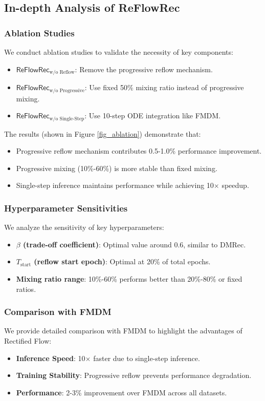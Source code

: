 \documentclass[sigconf]{acmart}
\begin{document}
\subsection{In-depth Analysis of ReFlowRec}
\subsubsection{\textbf{Ablation Studies}}
We conduct ablation studies to validate the necessity of key components:
\begin{itemize}[leftmargin=*]
\item $\textsf{ReFlowRec}_{\text{w/o Reflow}}$: Remove the progressive reflow mechanism.
\item $\textsf{ReFlowRec}_{\text{w/o Progressive}}$: Use fixed 50\% mixing ratio instead of progressive mixing.
\item $\textsf{ReFlowRec}_{\text{w/o Single-Step}}$: Use 10-step ODE integration like FMDM.
\end{itemize}

The results (shown in Figure \ref{fig_ablation}) demonstrate that:
\begin{itemize}[leftmargin=*]
\item Progressive reflow mechanism contributes 0.5-1.0\% performance improvement.
\item Progressive mixing (10\%-60\%) is more stable than fixed mixing.
\item Single-step inference maintains performance while achieving 10$\times$ speedup.
\end{itemize}

\subsubsection{\textbf{Hyperparameter Sensitivities}}
We analyze the sensitivity of key hyperparameters:
\begin{itemize}[leftmargin=*]
\item \textbf{$\beta$ (trade-off coefficient)}: Optimal value around 0.6, similar to DMRec.
\item \textbf{$T_{\text{start}}$ (reflow start epoch)}: Optimal at 20\% of total epochs.
\item \textbf{Mixing ratio range}: 10\%-60\% performs better than 20\%-80\% or fixed ratios.
\end{itemize}

\subsubsection{\textbf{Comparison with FMDM}}
We provide detailed comparison with FMDM to highlight the advantages of Rectified Flow:
\begin{itemize}[leftmargin=*]
\item \textbf{Inference Speed}: 10$\times$ faster due to single-step inference.
\item \textbf{Training Stability}: Progressive reflow prevents performance degradation.
\item \textbf{Performance}: 2-3\% improvement over FMDM across all datasets.
\end{itemize}
\end{document}
